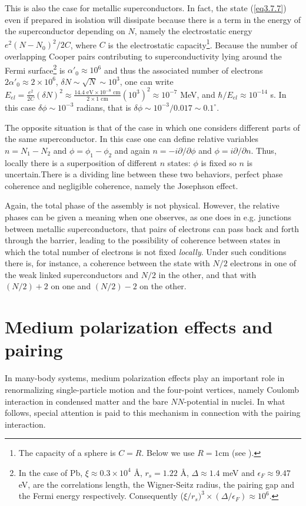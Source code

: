 This is also the case for metallic superconductors. In fact, the state (\ref{eq3.7.7}) even if prepared in isolation will dissipate because there is a term in the energy of the superconductor depending on $N$, namely the electrostatic energy $e^2(N-N_0)^2/2C$, where $C$ is the electrostatic capacity\footnote{The capacity of a sphere is $C=R$. Below we use $R=1$cm (see \cite{Anderson:64b}).}. Because the number of overlapping Cooper pairs contributing to superconductivity lying around the Fermi surface\footnote{In the case of Pb, $\xi\approx0.3\times10^4$ \AA, $r_s=1.22$ \AA, $\Delta\approx1.4$ meV and $\epsilon_F\approx9.47$ eV, are the correlations length, the Wigner-Seitz radius, the pairing gap and the Fermi energy respectively. Consequently ($\xi/r_s)^3\times(\Delta/\epsilon_F)\approx10^6$.} is $\alpha'_0\approx10^6$ and thus the associated number of electrons $2\alpha'_0\approx2\times10^6$, $\delta N\sim\sqrt{N}\sim10^3$, one can write $E_{el}=\frac{e^2}{2C}(\delta N)^2\approx\frac{14.4\text{ eV}\times10^{-8}\text{ cm}}{2\times1\text{ cm}}(10^3)^2\approx10^{-7}$ MeV, and $\hbar/E_{el}\approx 10^{-14}$ s.  In this case $\delta\phi\sim10^{-3}$ radians, that is $\delta\phi\sim10^{-3}/0.017\sim0.1^{\circ}$.   


The opposite situation is that of the case in which one considers different parts of the same superconductor. In this case one can define relative variables $n=N_1-N_2$ and $\phi=\phi_1-\phi_2$ and again $n=-i\partial/\partial \phi$ and $\phi=i\partial/\partial n$. Thus, locally there is a superposition of different $n$ states: $\phi$ is fixed so $n$ is uncertain.There is  a dividing line between these two behaviors, perfect phase coherence and negligible coherence, namely the Josephson effect.


Again, the total phase of the assembly is not physical. However, the relative phases can be given a meaning when one observes, as one does in e.g. junctions between metallic superconductors, that pairs of electrons can pass back and forth through the barrier, leading to the possibility of coherence between states in which the total number of electrons is not fixed \emph{locally}. Under such conditions there is, for instance, a coherence between the state with $N/2$ electrons in one of the weak linked superconductors  and $N/2$ in the other, and that with $(N/2)+2$ on one   and $(N/2)-2$ on the other.
\section{Medium polarization effects and pairing}\label{C3AppEx}
In many-body systems, medium polarization effects play an important role in renormalizing single-particle motion and the four-point vertices, namely Coulomb interaction in condensed matter and the bare $NN$-potential in nuclei. In what follows, special attention is paid to this mechanism in connection with the pairing interaction.
